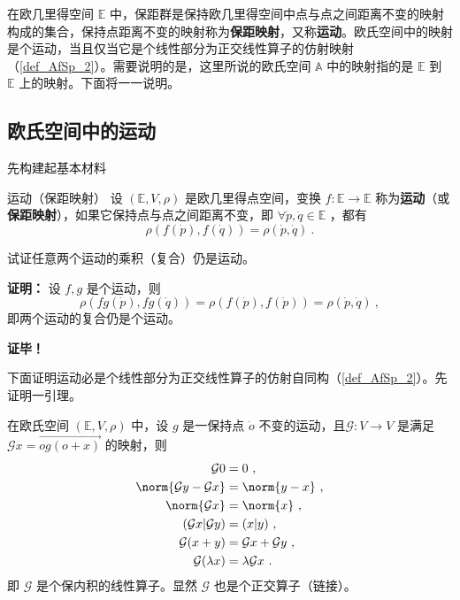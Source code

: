 
在欧几里得空间 $\mathbb E$ 中，保距群是保持欧几里得空间中点与点之间距离不变的映射构成的集合，保持点距离不变的映射称为\textbf{保距映射}，又称\textbf{运动}。欧氏空间中的映射是个运动，当且仅当它是个线性部分为正交线性算子的仿射映射（\autoref{def_AfSp_2}）。需要说明的是，这里所说的欧氏空间 $\mathbb A$ 中的映射指的是 $\mathbb E$ 到 $\mathbb E$ 上的映射。下面将一一说明。
\subsection{欧氏空间中的运动}
先构建起基本材料
\begin{definition}{运动（保距映射）}
设 $(\mathbb E,V,\rho)$ 是欧几里得点空间，变换 $f:\mathbb E\rightarrow\mathbb E$ 称为\textbf{运动}（或\textbf{保距映射}），如果它保持点与点之间距离不变，即 $\forall \dot p,\dot q\in\mathbb E$ ，都有
\begin{equation}
\rho(f(\dot p),f(\dot q))=\rho(\dot p,\dot q)~.
\end{equation}
\end{definition}
\begin{example}{}\label{ex_CDQ2Ec_1}
试证任意两个运动的乘积（复合）仍是运动。

\textbf{证明：}
设 $f,g$ 是个运动，则
\begin{equation}
\rho(fg(\dot p),fg(\dot q))=\rho(f(\dot p),f(\dot p))=\rho(\dot p,\dot q)~,
\end{equation}
即两个运动的复合仍是个运动。

\textbf{证毕！}
\end{example}
下面证明运动必是个线性部分为正交线性算子的仿射自同构（\autoref{def_AfSp_2}）。先证明一引理。
\begin{lemma}{}\label{lem_CDQ2Ec_1}
在欧氏空间 $(\mathbb E,V,\rho)$ 中，设 $g$ 是一保持点 $\dot o$ 不变的运动，且$\mathcal G:V\rightarrow V$ 是满足 $\mathcal G x=\overrightarrow{og(o+x)}$ 的映射，则
\begin{equation}
\begin{aligned}
\mathcal G 0&=0~,\\
\norm{\mathcal Gy-\mathcal Gx}&=\norm{y-x}~,\\
\norm{\mathcal G x}&=\norm{x}~,\\
(\mathcal G x|\mathcal G y)&=(x|y)~,\\
\mathcal G(x+y)&=\mathcal G x+\mathcal G y~,\\
\mathcal G(\lambda x)&=\lambda\mathcal G x~.
\end{aligned}
\end{equation}
即 $\mathcal G$ 是个保内积的线性算子。显然 $\mathcal G$ 也是个正交算子（链接）。
\end{lemma}
